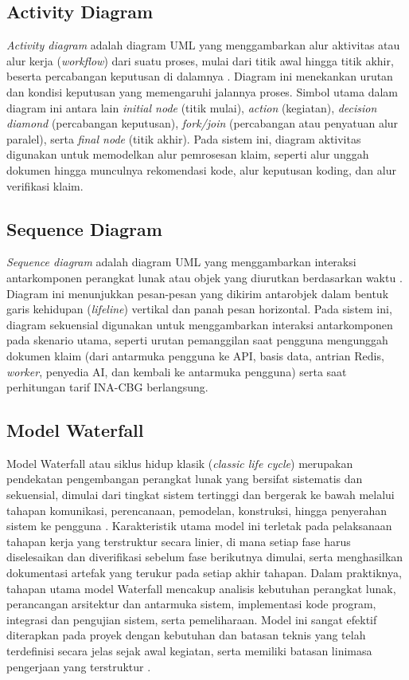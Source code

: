 \subsection{Activity Diagram}
\textit{Activity diagram} adalah diagram UML yang menggambarkan alur aktivitas atau alur kerja (\textit{workflow}) dari suatu proses, mulai dari titik awal hingga titik akhir, beserta percabangan keputusan di dalamnya \cite{8}. Diagram ini menekankan urutan dan kondisi keputusan yang memengaruhi jalannya proses. Simbol utama dalam diagram ini antara lain \textit{initial node} (titik mulai), \textit{action} (kegiatan), \textit{decision diamond} (percabangan keputusan), \textit{fork/join} (percabangan atau penyatuan alur paralel), serta \textit{final node} (titik akhir). Pada sistem ini, diagram aktivitas digunakan untuk memodelkan alur pemrosesan klaim, seperti alur unggah dokumen hingga munculnya rekomendasi kode, alur keputusan koding, dan alur verifikasi klaim.

\subsection{Sequence Diagram}
\textit{Sequence diagram} adalah diagram UML yang menggambarkan interaksi antarkomponen perangkat lunak atau objek yang diurutkan berdasarkan waktu \cite{8}. Diagram ini menunjukkan pesan-pesan yang dikirim antarobjek dalam bentuk garis kehidupan (\textit{lifeline}) vertikal dan panah pesan horizontal. Pada sistem ini, diagram sekuensial digunakan untuk menggambarkan interaksi antarkomponen pada skenario utama, seperti urutan pemanggilan saat pengguna mengunggah dokumen klaim (dari antarmuka pengguna ke API, basis data, antrian Redis, \textit{worker}, penyedia AI, dan kembali ke antarmuka pengguna) serta saat perhitungan tarif INA-CBG berlangsung.

\subsection{Model Waterfall}
Model Waterfall atau siklus hidup klasik (\textit{classic life cycle}) merupakan pendekatan pengembangan perangkat lunak yang bersifat sistematis dan sekuensial, dimulai dari tingkat sistem tertinggi dan bergerak ke bawah melalui tahapan komunikasi, perencanaan, pemodelan, konstruksi, hingga penyerahan sistem ke pengguna \cite{20}. Karakteristik utama model ini terletak pada pelaksanaan tahapan kerja yang terstruktur secara linier, di mana setiap fase harus diselesaikan dan diverifikasi sebelum fase berikutnya dimulai, serta menghasilkan dokumentasi artefak yang terukur pada setiap akhir tahapan. Dalam praktiknya, tahapan utama model Waterfall mencakup analisis kebutuhan perangkat lunak, perancangan arsitektur dan antarmuka sistem, implementasi kode program, integrasi dan pengujian sistem, serta pemeliharaan. Model ini sangat efektif diterapkan pada proyek dengan kebutuhan dan batasan teknis yang telah terdefinisi secara jelas sejak awal kegiatan, serta memiliki batasan linimasa pengerjaan yang terstruktur \cite{20}.

